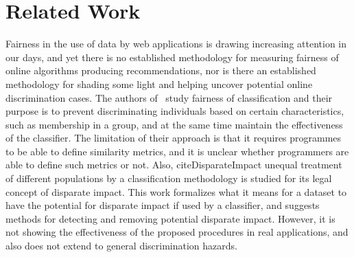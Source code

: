 \section{Related Work}
\label{sect:related}
Fairness in the use of data by web applications is drawing increasing
attention in our days, and yet there is no established methodology for
measuring fairness of online algorithms producing recommendations, nor is
there an established methodology for shading some light and helping
uncover potential online discrimination cases. The authors of~\cite{Fairness}
study fairness of classification and their purpose is to prevent
discriminating individuals based on certain characteristics, such as
membership in a group, and at the same time maintain the effectiveness of
the classifier. The limitation of their approach is that it requires
programmes to be able to define similarity metrics, and it is unclear
whether programmers are able to define such metrics or not. Also,
cite{DisparateImpact}
unequal treatment of different populations
by a classification methodology is studied for its legal concept of
disparate impact. This work formalizes what it means for a dataset to
have the potential for disparate impact if used by a classifier, and
suggests methods for detecting and removing potential disparate impact.
However, it is not showing the effectiveness of the proposed procedures
in real applications, and also does not extend to general discrimination
hazards.
